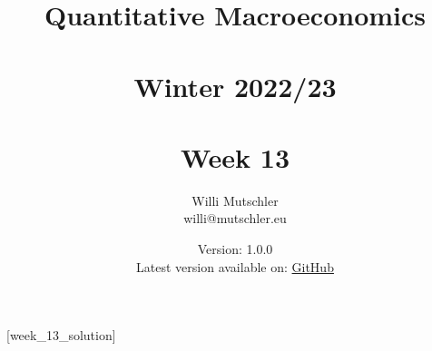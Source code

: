 
\newif\ifDisplaySolutions%


\title{Quantitative Macroeconomics\\~\\Winter 2022/23\\~\\Week 13}
\author{Willi Mutschler\\willi@mutschler.eu}
\date{Version: 1.0.0\\Latest version available on: \href{https://github.com/wmutschl/Quantitative-Macroeconomics/releases/latest/download/week_13.pdf}{GitHub}}
\maketitle\thispagestyle{empty}

\newpage
{}[week_13_solution]
\tableofcontents\thispagestyle{empty}\newpage

\setcounter{page}{1}
\newpage
\newpage
\newpage
\printbibliography

\ifDisplaySolutions
\newpage
\appendix

\section{Solutions}

\fi
